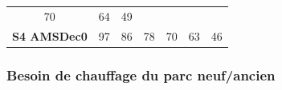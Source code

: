 \documentclass[]{article}
\begin{document}
\begin{longtable}[]{@{}crrrrrr@{}}
\begin{minipage}[t]{0.08\columnwidth}
70\strut
\end{minipage} & \begin{minipage}[t]{0.08\columnwidth}\raggedleft\strut
64\strut
\end{minipage} & \begin{minipage}[t]{0.08\columnwidth}\raggedleft\strut
49\strut
\end{minipage}\tabularnewline
\begin{minipage}[t]{0.19\columnwidth}\centering\strut
\textbf{S4 AMSDec0}\strut
\end{minipage} & \begin{minipage}[t]{0.08\columnwidth}\raggedleft\strut
97\strut
\end{minipage} & \begin{minipage}[t]{0.08\columnwidth}\raggedleft\strut
86\strut
\end{minipage} & \begin{minipage}[t]{0.08\columnwidth}\raggedleft\strut
78\strut
\end{minipage} & \begin{minipage}[t]{0.08\columnwidth}\raggedleft\strut
70\strut
\end{minipage} & \begin{minipage}[t]{0.08\columnwidth}\raggedleft\strut
63\strut
\end{minipage} & \begin{minipage}[t]{0.08\columnwidth}\raggedleft\strut
46\strut
\end{minipage}\tabularnewline
\bottomrule
\end{longtable}

\subsubsection{Besoin de chauffage du parc
neuf/ancien}\label{besoin-de-chauffage-du-parc-neufancien}
\end{document}
